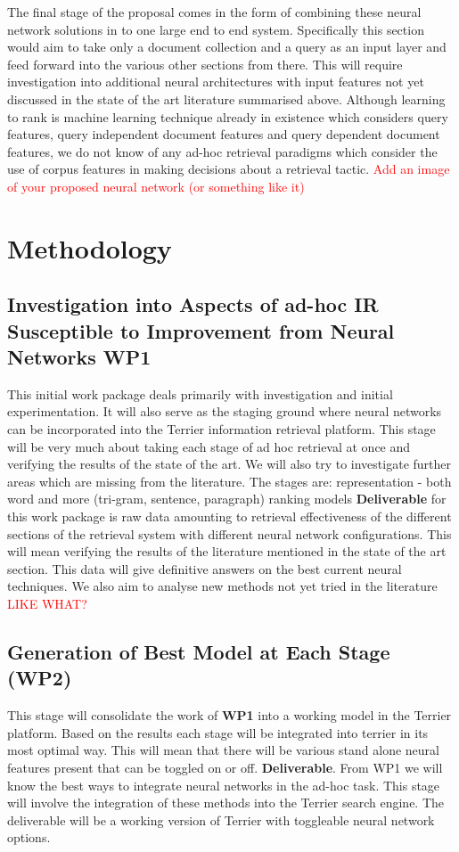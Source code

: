 \documentclass[11pt,english,twocolumn]{article}
\newcommand{\remove}[1]{\textcolor{red}{#1}}
\begin{document}
The final stage of the proposal comes in the form of combining these neural network solutions in to one large end to end system. Specifically this section would aim to take only a document collection and a query as an input layer and feed forward into the various other sections from there. This will require investigation into additional neural architectures with input features not yet discussed in the state of the art literature summarised above. Although learning to rank is machine learning technique already in existence which considers query features, query independent document features and query dependent document features, we do not know of any ad-hoc retrieval paradigms which consider the use of corpus features in making decisions about a retrieval tactic. \remove{Add an image of your proposed neural network (or something like it)}

\section{Methodology}
\subsection{Investigation into Aspects of ad-hoc IR Susceptible to Improvement from Neural Networks \textbf{WP1}}
This initial work package deals primarily with investigation and initial experimentation. 
It will also serve as the staging ground where neural networks can be incorporated into the Terrier information retrieval platform.
This stage will be very much about taking each stage of ad hoc retrieval at once and verifying the results of the state of the art.
We will also try to investigate further areas which are missing from the literature.
The stages are:
representation - both word and more (tri-gram, sentence, paragraph)
ranking models
\textbf{Deliverable} for this work package is raw data amounting to retrieval effectiveness of the different sections of the retrieval system with different neural network configurations. This will mean verifying the results of the literature mentioned in the state of the art section. This data will give definitive answers on the best current neural techniques. We also aim to analyse new methods not yet tried in the literature \remove{ LIKE WHAT? }

\subsection{Generation of Best Model at Each Stage (\textbf{WP2})}
This stage will consolidate the work of \textbf{WP1} into a working model in the Terrier platform. Based on the results each stage will be integrated into terrier in its most optimal way. This will mean that there will be various stand alone neural features present that can be toggled on or off. \textbf{Deliverable}. From WP1 we will know the best ways to integrate neural networks in the ad-hoc task. This stage will involve the integration of these methods into the Terrier search engine. The deliverable will be a working version of Terrier with toggleable neural network options.
\end{document}
